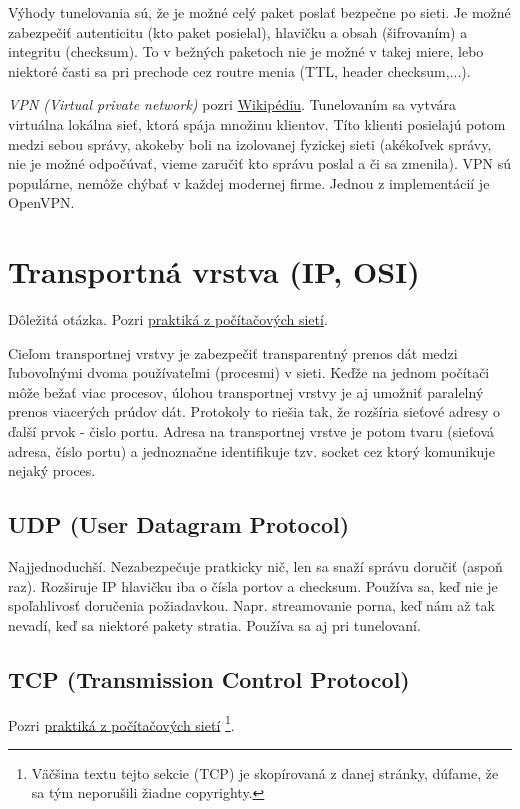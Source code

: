 \documentclass[10pt,a4paper]{article}
\begin{document}
Výhody tunelovania sú, že je možné celý paket poslať bezpečne po sieti. Je možné zabezpečiť autenticitu (kto paket posielal), hlavičku a obsah (šifrovaním) a integritu (checksum). 
To v bežných paketoch nie je možné v takej miere, lebo niektoré časti sa pri prechode cez routre menia (TTL, header checksum,...).  

\emph{VPN (Virtual private network)} pozri \href{http://en.wikipedia.org/wiki/Virtual_private_network}{Wikipédiu}.
Tunelovaním sa vytvára virtuálna lokálna sieť, ktorá spája množinu klientov. Títo klienti posielajú potom medzi sebou správy, akokeby boli na izolovanej fyzickej sieti (akékoľvek správy, nie je možné odpočúvať, vieme zaručiť kto správu poslal a či sa zmenila). 
VPN sú populárne, nemôže chýbať v každej modernej firme. 
Jednou z implementácií je OpenVPN. 
                                                           
\section{Transportná vrstva (IP, OSI)}       
Dôležitá otázka. Pozri \href{http://netlab.dcs.fmph.uniba.sk/siete/cviko4/}{praktiká z počítačových sietí}. 
   
Cieľom transportnej vrstvy je zabezpečiť transparentný prenos dát medzi ľubovoľnými dvoma používateľmi (procesmi) v sieti. Keďže na jednom počítači môže bežať viac procesov, úlohou transportnej vrstvy je aj umožniť paralelný prenos viacerých prúdov dát. Protokoly to riešia tak, že rozšíria sieťové adresy o ďalší prvok - čislo portu. Adresa na transportnej vrstve je potom tvaru (sieťová adresa, číslo portu) a jednoznačne identifikuje tzv. socket cez ktorý komunikuje nejaký proces.
   
\subsection{UDP (User Datagram Protocol)}   
Najjednoduchší. Nezabezpečuje pratkicky nič, len sa snaží správu doručiť (aspoň raz). 
Rozširuje IP hlavičku iba o čísla portov a checksum. 
Používa sa, keď nie je spoľahlivosť doručenia požiadavkou. Napr. streamovanie porna, keď nám až tak nevadí, keď sa niektoré pakety stratia. 
Používa sa aj pri tunelovaní. 

\subsection{TCP (Transmission Control Protocol)}   
\label{TCP}
Pozri \href{http://netlab.dcs.fmph.uniba.sk/siete/cviko5/}{praktiká z počítačových sietí} \footnote{Väčšina textu tejto sekcie (TCP) je skopírovaná z danej stránky, dúfame, že sa tým neporušili žiadne copyrighty.}.
\end{document}
